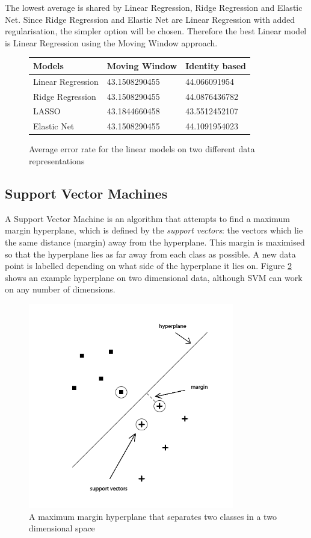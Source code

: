 The lowest average is shared by Linear Regression, Ridge Regression and Elastic Net. Since Ridge Regression and Elastic Net are Linear Regression with added regularisation, the simpler option will be chosen. Therefore the best Linear model is Linear Regression using the Moving Window approach.

\begin{figure}[h!]
\centering
\begin{tabular}{l || l | l}
Models & Moving Window & Identity based \\ \hline \hline
Linear Regression & 43.1508290455 & 44.066091954 \\ \hline
Ridge Regression & 43.1508290455 & 44.0876436782 \\ \hline
LASSO & 43.1844660458 & 43.5512452107 \\ \hline
Elastic Net & 43.1508290455 & 44.1091954023 \\ \hline
\end{tabular}
\caption{Average error rate for the linear models on two different data representations}
\label{table:linearmodelsaverages}
\end{figure}

\subsection{Support Vector Machines}
A Support Vector Machine is an algorithm that attempts to find a maximum margin hyperplane, which is defined by the {\it support vectors}: the vectors which lie the same distance (margin) away from the hyperplane. This margin is maximised so that the hyperplane lies as far away from each class as possible. A new data point is labelled depending on what side of the hyperplane it lies on. Figure \ref{fig:hyperplane} shows an example hyperplane on two dimensional data, although SVM can work on any number of dimensions.

\begin{figure}[h!]
\centering
\includegraphics[width=0.8\textwidth]{images/hyperplane.png}
\caption{A maximum margin hyperplane that separates two classes in a two dimensional space}
\label{fig:hyperplane}
\end{figure}


